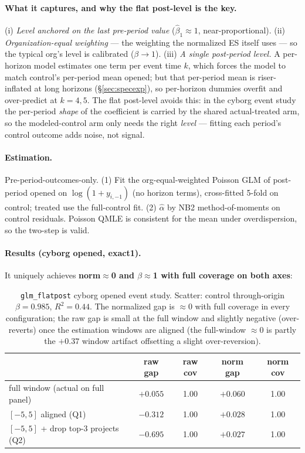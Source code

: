 \documentclass[11pt]{article}
\begin{document}
\paragraph{What it captures, and why the flat post-level is the key.} (i) \emph{Level anchored on the last pre-period value} ($\hat\beta_1\approx1$, near-proportional). (ii) \emph{Organization-equal weighting} --- the weighting the normalized ES itself uses --- so the typical org's level is calibrated ($\beta\to1$). (iii) \emph{A single post-period level.} A per-horizon model estimates one term per event time $k$, which forces the model to match control's per-period mean opened; but that per-period mean is riser-inflated at long horizons (\S\ref{sec:specexp}), so per-horizon dummies overfit and over-predict at $k=4,5$. The flat post-level avoids this: in the cyborg event study the per-period \emph{shape} of the coefficient is carried by the shared actual-treated arm, so the modeled-control arm only needs the right \emph{level} --- fitting each period's control outcome adds noise, not signal.

\paragraph{Estimation.} Pre-period-outcomes-only. (1) Fit the org-equal-weighted Poisson GLM of post-period opened on $\log(1+y_{i,-1})$ (no horizon terms), cross-fitted 5-fold on control; treated use the full-control fit. (2) $\hat\alpha$ by NB2 method-of-moments on control residuals. Poisson QMLE is consistent for the mean under overdispersion, so the two-step is valid.

\paragraph{Results (cyborg opened, exact1).} It uniquely achieves \textbf{norm$\approx$0 and $\beta\approx$1 with full coverage on both axes}:
\begin{table}[h]\centering\small
\begin{tabular}{lcccc}
\toprule
 & raw gap & raw cov & norm gap & norm cov\\
\midrule
full window (actual on full panel)     & $+0.055$ & 1.00 & $+0.060$ & 1.00\\
$[-5,5]$ aligned (Q1)                   & $-0.312$ & 1.00 & $+0.028$ & 1.00\\
$[-5,5]$ + drop top-3 projects (Q2)     & $-0.695$ & 1.00 & $+0.027$ & 1.00\\
\bottomrule
\end{tabular}
\caption{\texttt{glm\_flatpost} cyborg opened event study. Scatter: control through-origin $\beta=0.985$, $R^2=0.44$. The normalized gap is $\approx0$ with full coverage in every configuration; the raw gap is small at the full window and slightly negative (over-reverts) once the estimation windows are aligned (the full-window $\approx0$ is partly the $+0.37$ window artifact offsetting a slight over-reversion).}
\end{table}
\end{document}
